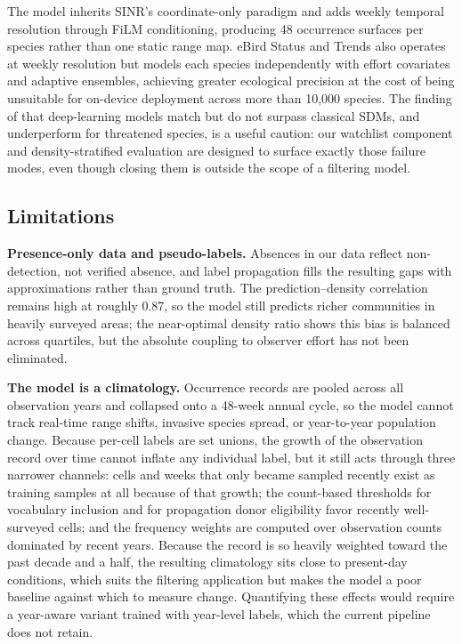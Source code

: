 The model inherits SINR's coordinate-only paradigm \citep{cole2023spatial} and adds weekly temporal resolution through FiLM conditioning, producing 48 occurrence surfaces per species rather than one static range map. eBird Status and Trends \citep{fink2024ebird} also operates at weekly resolution but models each species independently with effort covariates and adaptive ensembles, achieving greater ecological precision at the cost of being unsuitable for on-device deployment across more than 10,000 species. The finding of \citet{kellenberger2026performance} that deep-learning models match but do not surpass classical SDMs, and underperform for threatened species, is a useful caution: our watchlist component and density-stratified evaluation are designed to surface exactly those failure modes, even though closing them is outside the scope of a filtering model.

\subsection{Limitations}
\label{sec:limitations}

\textbf{Presence-only data and pseudo-labels.} Absences in our data reflect non-detection, not verified absence, and label propagation fills the resulting gaps with approximations rather than ground truth. The prediction--density correlation remains high at roughly 0.87, so the model still predicts richer communities in heavily surveyed areas; the near-optimal density ratio shows this bias is balanced across quartiles, but the absolute coupling to observer effort has not been eliminated.

\textbf{The model is a climatology.} Occurrence records are pooled across all observation years and collapsed onto a 48-week annual cycle, so the model cannot track real-time range shifts, invasive species spread, or year-to-year population change. Because per-cell labels are set unions, the growth of the observation record over time cannot inflate any individual label, but it still acts through three narrower channels: cells and weeks that only became sampled recently exist as training samples at all because of that growth; the count-based thresholds for vocabulary inclusion and for propagation donor eligibility favor recently well-surveyed cells; and the frequency weights are computed over observation counts dominated by recent years. Because the record is so heavily weighted toward the past decade and a half, the resulting climatology sits close to present-day conditions, which suits the filtering application but makes the model a poor baseline against which to measure change. Quantifying these effects would require a year-aware variant trained with year-level labels, which the current pipeline does not retain.

